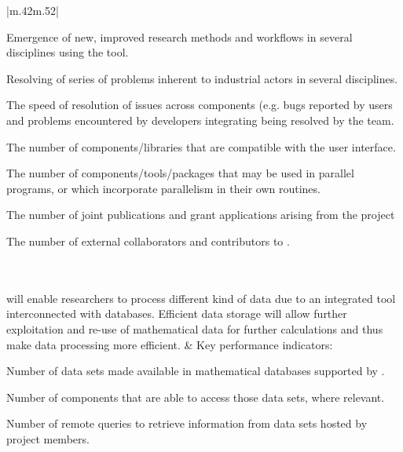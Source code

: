 \begin{supertabular}{|m{.42\textwidth}m{.52\textwidth}|}
\begin{compactenum}
\item Emergence of new, improved research methods and workflows 
in several disciplines using the tool. %
\item Resolving of series of problems inherent to industrial actors in several disciplines.
\item The speed of resolution of issues across components (e.g. bugs 
reported by \Sage users and problems encountered by \Sage developers 
integrating \GAP being resolved by the \GAP team. 
\item The number of components/libraries that are compatible with the \TheProject user interface.
\item The number of components/tools/packages that may be used in parallel
programs, or which incorporate parallelism in their own routines.
\item The number of joint publications and grant applications arising from the project
\item The number of external collaborators and contributors to \TheProject.
\end{compactenum}
\\\hline
\hline{}\\\hline
\TheProject will enable researchers to process
different kind of  data due to an integrated tool interconnected
with databases. Efficient data storage will allow further exploitation
and  re-use of mathematical data for further calculations and thus make
data processing more efficient.
 &
Key performance indicators:
\begin{compactenum}
\item Number of data sets made available in mathematical databases supported by \TheProject.
\item Number of \TheProject components that are able to access those data sets, where relevant.
\item Number of remote queries to retrieve information from data sets hosted by project members.
\end{compactenum}
\\\hline

\hline{}\\\hline


\end{supertabular}
